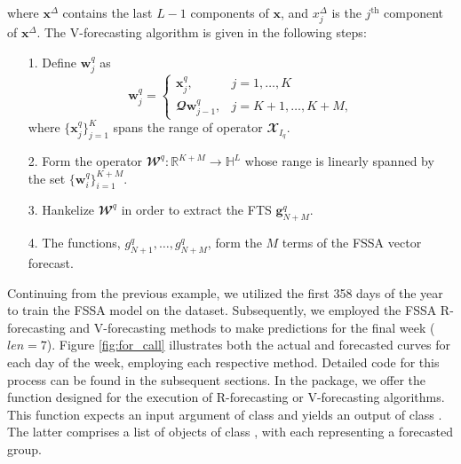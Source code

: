 where $\pmb{x}^{\Delta}$ contains the last $L-1$ components of $\pmb{x}$, and $x_{j}^{\Delta}$ is the $j^{\text{th}}$ component of $\pmb{x}^{\Delta}$. The V-forecasting algorithm is given in the following steps:
\begin{enumerate}
\item[1.] Define $\pmb{w}^{q}_{j}$ as
\[\pmb{w}^{q}_{j}= \begin{cases} 
      \pmb{x}^{q}_{j}, & j=1,\dots, K \\
     \mathbfcal{Q}\pmb{w}^{q}_{j-1}, & j=K+1, \dots, K+M,
   \end{cases}
\]
where $\{\pmb{x}^{q}_{j}\}_{j=1}^{K}$ spans the range of operator $\mathbfcal{X}_{I_{q}}$.
\item[2.] Form the operator $\mathbfcal{W}^q:\mathbb{R}^{K+M} \rightarrow \mathbb{H}^{L}$ whose range is linearly spanned by the set $\{\pmb{w}_{i}^q\}_{i=1}^{K+M}$.
\item[3.] Hankelize $\mathbfcal{W}^q$ in order to extract the FTS $\mathbf{g}^{q}_{N+M}$.
\item[4.] The functions, $g^{q}_{N+1}, \dots, g^{q}_{N+M}$, form the $M$ terms of the FSSA vector forecast.
\end{enumerate}
Continuing from the previous example, we utilized the first 358 days of the year to 
train the FSSA model on the  dataset. Subsequently, we employed the 
FSSA R-forecasting and V-forecasting methods to make predictions for the final week 
($len = 7$). Figure \ref{fig:for_call} illustrates both the actual and forecasted 
curves for each day of the week, employing each respective method. Detailed code for 
this process can be found in the subsequent sections.
In the  package, we offer the  function 
designed for the execution of R-forecasting or V-forecasting algorithms. This 
function expects an input argument of class  and yields an output of 
class . The latter comprises a list of objects of class 
, with each  representing a forecasted group.
